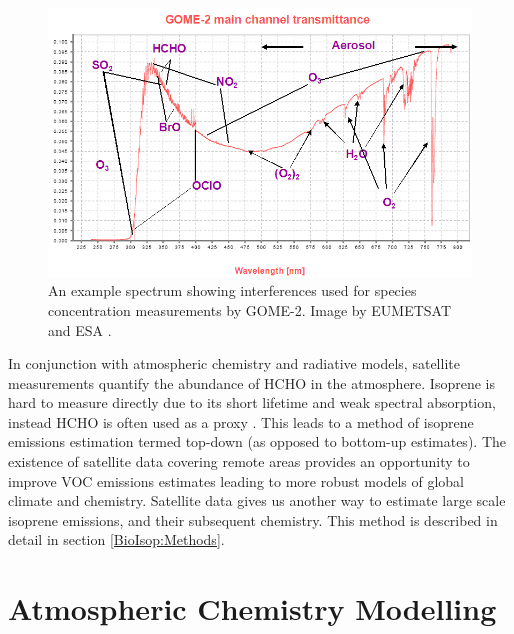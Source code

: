       \begin{figure}
        \includegraphics[width=\textwidth]{Figures/GOME_SPECTRUM.jpg}
        \caption{%
          An example spectrum showing interferences used for species concentration measurements by GOME-2. Image by EUMETSAT and ESA \parencite{GOME2Image}.
          }
        \label{LR:HCHO:Sat:fig_GOME_products}
      \end{figure}
      
      In conjunction with atmospheric chemistry and radiative models, satellite measurements quantify the abundance of HCHO in the atmosphere.
      Isoprene is hard to measure directly due to its short lifetime and weak spectral absorption, instead HCHO is often used as a proxy \parencite{Millet2006, Fu2007, Dufour2009, Marais2012, bauwens2013satellite, Kefauver2014, Bauwens2016, Surl2018}.
      This leads to a method of isoprene emissions estimation termed top-down (as opposed to bottom-up estimates).
      The existence of satellite data covering remote areas provides an opportunity to improve VOC emissions estimates leading to more robust models of global climate and chemistry. 
      Satellite data gives us another way to estimate large scale isoprene emissions, and their subsequent chemistry.
      This method is described in detail in section \ref{BioIsop:Methods}.
  
\section{Atmospheric Chemistry Modelling}
\label{LR:Models}
  

